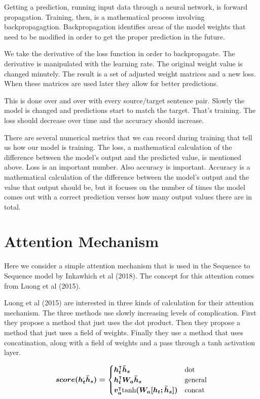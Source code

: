Getting a prediction, running input data through a neural network, is forward propagation. Training, then, is a mathematical process involving backpropagagtion. Backpropagation identifies areas of the model weights that need to be modified in order to get the proper prediction in the future.

We take the derivative of the loss function in order to backpropagate. The derivative is manipulated with the learning rate. The original weight value is changed minutely. The result is a set of adjusted weight matrices and a new loss. When these matrices are used later they allow for better predictions. 

This is done over and over with every source/target sentence pair. Slowly the model is changed and predictions start to match the target. That's training. The loss should decrease over time and the accuracy should increase.

There are several numerical metrics that we can record during training that tell us how our model is training. The loss, a mathematical calculation of the difference between the model's output and the predicted value, is mentioned above. Loss is an important number. Also accuracy is important. Accuracy is a mathematical calculation of the difference between the model's output and the value that output should be, but it focuses on the number of times the model comes out with a correct prediction verses how many output values there are in total.

\section{Attention Mechanism}

Here we consider a simple attention mechanism that is used in the Sequence to Sequence model by Inkawhich et al (2018)\cite{2018Inkawhich}. The concept for this attention comes from Luong et al (2015)\cite{DBLP:journals/corr/LuongPM15}.

Luong et al (2015)\cite{DBLP:journals/corr/LuongPM15} are interested in three kinds of calculation for their attention mechanism. The three methods use slowly increasing levels of complication. First they propose a method that just uses the dot product. Then they propose a method that just uses a field of weights. Finally they use a method that uses concatination, along with a field of weights and a pass through a tanh activation layer.

$$
\boldmath
score(h_t^ \text{,} \bar{h}_s) =
\begin{cases}
    h_t^\intercal \bar{h}_s & \text{dot} \\
	h_t^\intercal W_a \bar{h}_s & \text{general} \\
	v_a^\intercal \text{tanh}(W_a [h_t ; \bar{h}_s] ) & \text{concat}
\end{cases}
\unboldmath
$$

